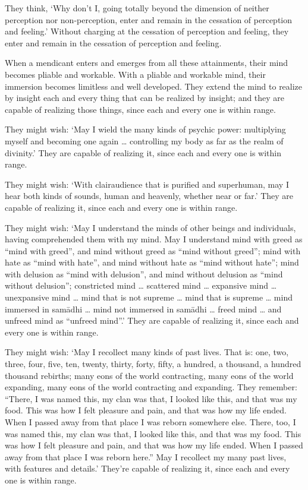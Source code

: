 \documentclass[12pt,openany]{book}%
\begin{document}
They think, ‘Why don’t I, going totally beyond the dimension of neither perception nor non-perception, enter and remain in the cessation of perception and feeling.’ Without charging at the cessation of perception and feeling, they enter and remain in the cessation of perception and feeling. 

When a mendicant enters and emerges from all these attainments, their mind becomes pliable and workable. With a pliable and workable mind, their immersion becomes limitless and well developed. They extend the mind to realize by insight each and every thing that can be realized by insight; and they are capable of realizing those things, since each and every one is within range. 

They might wish: ‘May I wield the many kinds of psychic power: multiplying myself and becoming one again … controlling my body as far as the realm of divinity.’ They are capable of realizing it, since each and every one is within range. 

They might wish: ‘With clairaudience that is purified and superhuman, may I hear both kinds of sounds, human and heavenly, whether near or far.’ They are capable of realizing it, since each and every one is within range. 

They might wish: ‘May I understand the minds of other beings and individuals, having comprehended them with my mind. May I understand mind with greed as “mind with greed”, and mind without greed as “mind without greed”; mind with hate as “mind with hate”, and mind without hate as “mind without hate”; mind with delusion as “mind with delusion”, and mind without delusion as “mind without delusion”; constricted mind … scattered mind … expansive mind … unexpansive mind … mind that is not supreme … mind that is supreme … mind immersed in \textsanskrit{samādhi} … mind not immersed in \textsanskrit{samādhi} … freed mind … and unfreed mind as “unfreed mind”.’ They are capable of realizing it, since each and every one is within range. 

They might wish: ‘May I recollect many kinds of past lives. That is: one, two, three, four, five, ten, twenty, thirty, forty, fifty, a hundred, a thousand, a hundred thousand rebirths; many eons of the world contracting, many eons of the world expanding, many eons of the world contracting and expanding. They remember: “There, I was named this, my clan was that, I looked like this, and that was my food. This was how I felt pleasure and pain, and that was how my life ended. When I passed away from that place I was reborn somewhere else. There, too, I was named this, my clan was that, I looked like this, and that was my food. This was how I felt pleasure and pain, and that was how my life ended. When I passed away from that place I was reborn here.” May I recollect my many past lives, with features and details.’ They’re capable of realizing it, since each and every one is within range. 
\end{document}
